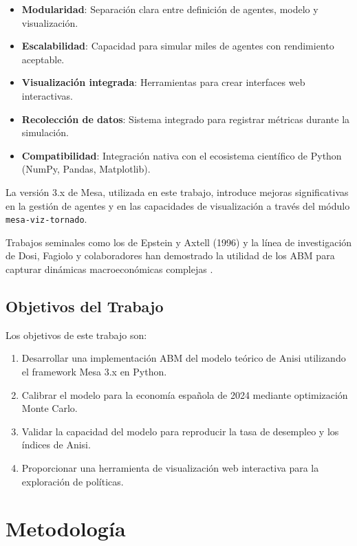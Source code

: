 \begin{itemize}
    \item \textbf{Modularidad}: Separación clara entre definición de agentes, modelo y visualización.
    \item \textbf{Escalabilidad}: Capacidad para simular miles de agentes con rendimiento aceptable.
    \item \textbf{Visualización integrada}: Herramientas para crear interfaces web interactivas.
    \item \textbf{Recolección de datos}: Sistema integrado para registrar métricas durante la simulación.
    \item \textbf{Compatibilidad}: Integración nativa con el ecosistema científico de Python (NumPy, Pandas, Matplotlib).
\end{itemize}

La versión 3.x de Mesa, utilizada en este trabajo, introduce mejoras significativas en la gestión de agentes y en las capacidades de visualización a través del módulo \texttt{mesa-viz-tornado}.

Trabajos seminales como los de Epstein y Axtell (1996) y la línea de investigación de Dosi, Fagiolo y colaboradores han demostrado la utilidad de los ABM para capturar dinámicas macroeconómicas complejas \cite{epstein1996, dosi2010, fagiolo2004}.

\subsection{Objetivos del Trabajo}

Los objetivos de este trabajo son:

\begin{enumerate}
    \item Desarrollar una implementación ABM del modelo teórico de Anisi utilizando el framework Mesa 3.x en Python.
    \item Calibrar el modelo para la economía española de 2024 mediante optimización Monte Carlo.
    \item Validar la capacidad del modelo para reproducir la tasa de desempleo y los índices de Anisi.
    \item Proporcionar una herramienta de visualización web interactiva para la exploración de políticas.
\end{enumerate}


\section{Metodología}

